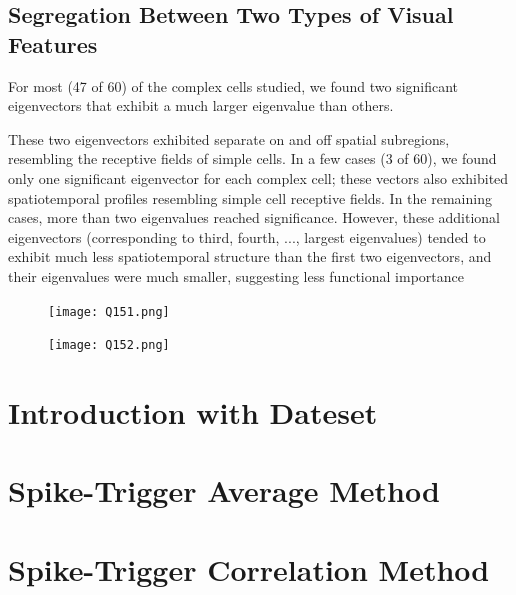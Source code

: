 \documentclass[12pt,a4paper,colorlinks=true]{article}
\begin{document}
	\subsection{Segregation Between Two Types of Visual Features} \label{S01_5}
	
	For most (47 of 60) of the complex cells studied, we found two significant eigenvectors that exhibit a much larger eigenvalue than others.

	These two eigenvectors exhibited separate on and off spatial subregions, resembling the receptive fields of simple cells. In a few cases (3 of 60), we found only one significant eigenvector for each complex cell; these vectors also exhibited spatiotemporal profiles resembling simple cell receptive fields. In the remaining cases, more than two eigenvalues reached significance. However, these additional eigenvectors (corresponding to third, fourth, ..., largest eigenvalues) tended to exhibit much less spatiotemporal structure than the first two eigenvectors, and their eigenvalues were much smaller, suggesting less functional importance
	

\begin{figure}[!hbt]
	\centering
	\begin{minipage}{.3\linewidth}
		\texttt{[image: Q151.png]}
		\caption{}
		\label{Q151.png}
	\end{minipage}%
	\begin{minipage}{.7\linewidth}
		\texttt{[image: Q152.png]}
		\caption{}
		\label{Q152.png}
	\end{minipage}
\end{figure}
	
	\newpage
		
	\section{Introduction with Dateset} \label{S02}
	
	
	\newpage
	
	\section{Spike-Trigger Average Method} \label{S03}
	
	\newpage
	
	\section{Spike-Trigger Correlation Method} \label{S04}
	
\end{document}
